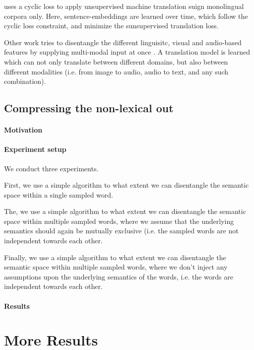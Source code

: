 \documentclass[a4paper,12pt,twoside,openright]{report}
\begin{document}
\cite{lample18} uses a cyclic loss to apply unsupervised machine translation suign monolingual corpora only. 
Here, sentence-embeddings are learned over time, which follow the cyclic loss constraint, and minimize the sunsupervised translation loss.

Other work tries to disentangle the different linguisitc, visual and audio-based features by supplying multi-modal input at once \cite{ma19}.
A translation model is learned which can not only translate between different domains, but also between different modalities (i.e. from image to audio, audio to text, and any such combination).


\section{Compressing the non-lexical out}

\subsubsection{Motivation}
\subsubsection{Experiment setup}

We conduct three experiments.

First, we use a simple algorithm to what extent we can disentangle the semantic space within a single sampled word.

The, we use a simple algorithm to what extent we can disentangle the semantic space within multiple sampled words, where we assume that the underlying semantics should again be mutually exclusive (i.e. the sampled words are not independent towards each other.

Finally, we use a simple algorithm to what extent we can disentangle the semantic space within multiple sampled words, where we don't inject any assumptions upon the underlying semantics of the words, i.e. the words are independent towards each other.


\subsubsection{Results}


\chapter{More Results}
\end{document}
